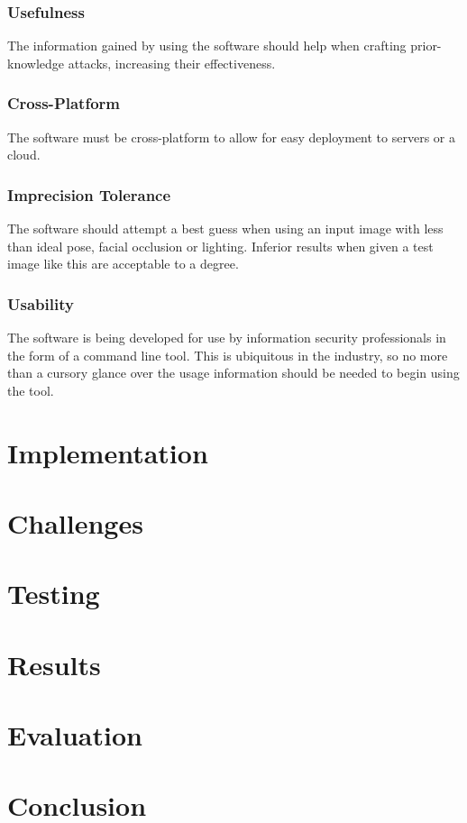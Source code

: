 \documentclass{article}
\begin{document}
\subsubsection{Usefulness}
The information gained by using the software should help when crafting prior-knowledge attacks, increasing their effectiveness.

\subsubsection{Cross-Platform}
The software must be cross-platform to allow for easy deployment to servers or a cloud.

\subsubsection{Imprecision Tolerance}
The software should attempt a best guess when using an input image with less than ideal pose, facial occlusion or lighting. Inferior results when given a test image like this are acceptable to a degree.

\subsubsection{Usability}
The software is being developed for use by information security professionals in the form of a command line tool. This is ubiquitous in the industry, so no more than a cursory glance over the usage information should be needed to begin using the tool.


\section{Implementation}




\section{Challenges}




\section{Testing}
\section{Results}
\section{Evaluation}
\section{Conclusion}
\end{document}
